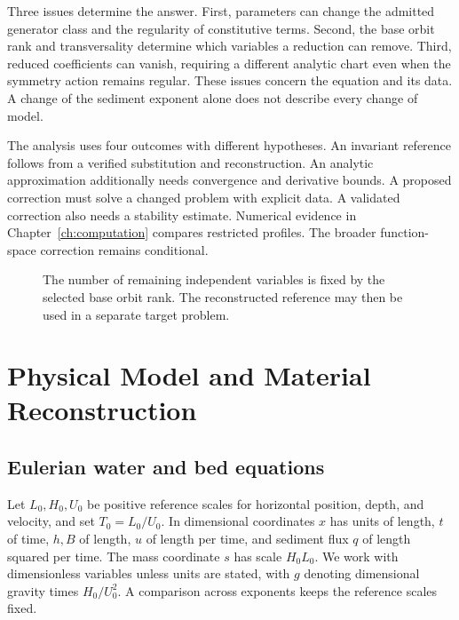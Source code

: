 \documentclass[12pt,a4paper,oneside]{report}
\numberwithin{equation}{chapter}
\theoremstyle{remark}\newtheorem{remark}[theorem]{Remark}
\begin{document}
Three issues determine the answer. First, parameters can change the admitted generator class and the regularity of constitutive terms. Second, the base orbit rank and transversality determine which variables a reduction can remove. Third, reduced coefficients can vanish, requiring a different analytic chart even when the symmetry action remains regular. These issues concern the equation and its data. A change of the sediment exponent alone does not describe every change of model.

The analysis uses four outcomes with different hypotheses. An invariant reference follows from a verified substitution and reconstruction. An analytic approximation additionally needs convergence and derivative bounds. A proposed correction must solve a changed problem with explicit data. A validated correction also needs a stability estimate. Numerical evidence in Chapter~\ref{ch:computation} compares restricted profiles. The broader function-space correction remains conditional.

\begin{figure}[htb]\centering
{}
\caption[Reduction and reconstruction workflow]{The number of remaining independent variables is fixed by the selected base orbit rank. The reconstructed reference may then be used in a separate target problem.}
\label{fig:workflow}
\end{figure}

\chapter{Physical Model and Material Reconstruction}\label{ch:models}
\section{Eulerian water and bed equations}
Let $L_0,H_0,U_0$ be positive reference scales for horizontal position, depth, and velocity, and set $T_0=L_0/U_0$. In dimensional coordinates $x$ has units of length, $t$ of time, $h,B$ of length, $u$ of length per time, and sediment flux $q$ of length squared per time. The mass coordinate $s$ has scale $H_0L_0$. We work with dimensionless variables unless units are stated, with $g$ denoting dimensional gravity times $H_0/U_0^2$. A comparison across exponents keeps the reference scales fixed.
\end{document}

